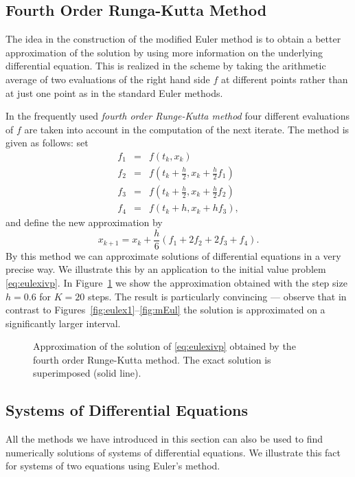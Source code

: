\documentclass{ximera}
\begin{document}
\subsection*{Fourth Order Runga-Kutta Method}

The idea in the construction of the modified Euler method is to obtain a 
better approximation of the solution by using more information on the 
underlying differential equation.  This is realized in the scheme by 
taking the arithmetic average of two evaluations of the right hand side 
$f$ at different points rather than at just one point as in the 
standard Euler methods.

In the frequently used {\em fourth order Runge-Kutta method\/} four 
different evaluations of $f$ are taken into account in the computation of 
the next iterate.  The method is given as follows: set
\begin{eqnarray*}
f_1 &=& f(t_k,x_k)\\
f_2 &=& f\left(t_k+\frac{h}{2},x_k+\frac{h}{2}f_1\right)\\
f_3 &=& f\left(t_k+\frac{h}{2},x_k+\frac{h}{2}f_2\right)\\
f_4 &=& f(t_k+h,x_k+hf_3),
\end{eqnarray*}
and define the new approximation by
\[
x_{k+1} = x_k+\frac{h}{6}(f_1+2f_2+2f_3+f_4).
\]
By this method we can approximate solutions of differential equations
in a very precise way.  We illustrate this by an application to 
the initial value problem \eqref{eq:eulexivp}.  In Figure~\ref{fig:rk1} we
show the approximation obtained with the step size $h=0.6$ for $K=20$
steps.  The result is particularly convincing --- observe that
in contrast to Figures~\ref{fig:eulex1}--\ref{fig:mEul} the solution is
approximated on a significantly larger interval.
\begin{figure}[htb]
   \centerline{%
   }
   \caption{Approximation of the solution of
   \protect\eqref{eq:eulexivp} obtained by the fourth order Runge-Kutta
   method.  The exact solution is superimposed (solid line).}
   \label{fig:rk1}
\end{figure}

\subsection*{Systems of Differential Equations}

All the methods we have introduced in this section can
also be used to find numerically solutions of systems 
of differential equations.  We illustrate this fact for
systems of two equations using Euler's method.
\end{document}
